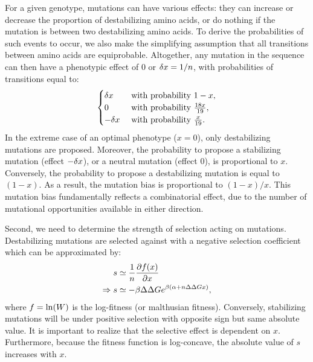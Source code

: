 For a given genotype, mutations can have various effects: they can increase or decrease the proportion of destabilizing amino acids, or do nothing if the mutation is between two destabilizing amino acids.
To derive the probabilities of such events to occur, we also make the simplifying assumption that all transitions between amino acids are equiprobable.
Altogether, any mutation in the sequence can then have a phenotypic effect of $0$ or $\delta x=1 /n$, with probabilities of transitions equal to:
\begin{gather}
    \begin{cases}
        \dx &\text{ with probability } 1-x, \\
        0 &\text{ with probability } \frac{18 x }{19}, \\
        -\dx &\text{ with probability } \frac{x}{19}.\\
    \end{cases} \label{eq:proba}
\end{gather}
In the extreme case of an optimal phenotype ($x = 0$), only destabilizing mutations are proposed.
Moreover, the probability to propose a stabilizing mutation (effect $-\delta x$), or a neutral mutation (effect $0$), is proportional to $x$.
Conversely, the probability to propose a destabilizing mutation is equal to $(1-x)$.
As a result, the mutation bias is proportional to $(1-x)/x$.
This mutation bias fundamentally reflects a combinatorial effect, due to the number of mutational opportunities available in either direction.

Second, we need to determine the strength of selection acting on mutations.
Destabilizing mutations are selected against with a negative selection coefficient which can be approximated by:
\begin{align}
    s & \simeq \frac{1}{\NbrSites}\frac{ \partial \logfit (x) }{\partial x} \label{eq:s} \\
    \Rightarrow s & \simeq - \beta \DeltaDeltaG e^{\beta (\DeltaGmin + \NbrSites \DeltaDeltaG x)}, \label{eq:s-unfolded}
\end{align}
where $ f = \ln (W)$ is the log-fitness (or malthusian fitness).
Conversely, stabilizing mutations will be under positive selection with opposite sign but same absolute value.
It is important to realize that the selective effect is dependent on $x$.
Furthermore, because the fitness function is log-concave, the absolute value of $s$ increases with $x$.

